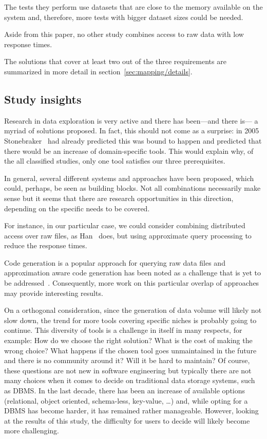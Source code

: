 The tests they perform use datasets that are close
to the memory available on the system and, therefore, more tests with bigger dataset sizes
could be needed.

Aside from this paper, no other study combines access to raw data with low
response times.

The solutions that cover at least two out of the three requirements are 
summarized in more detail in section~\ref{sec:mapping/details}.

\subsection{Study insights}
\label{sec:mapping/insights}
Research in data exploration is very active and there has been---and there is---
a myriad of solutions proposed. In fact, this should not come as a surprise:
in 2005 Stonebraker~\cite{Stonebraker2005} had already predicted this was bound to
happen and predicted that there would be an increase of domain-specific tools.
This would explain why, of the all classified studies, only one tool satisfies our
three prerequisites.

In general, several different systems and approaches have been proposed, which could,
perhaps, be seen as building blocks. Not all combinations necessarily make sense
but it seems that there are research opportunities in this direction, depending
on the specific needs to be covered.

For instance, in our particular case, we could consider combining distributed
access over raw files, as Han~\cite{Han2017} does, but using approximate query
processing to reduce the response times.

Code generation is a popular approach for querying raw data files
and approximation aware code generation has been noted as a challenge
that is yet to be addressed~\cite{Mozafari2017AQP}. Consequently, more work on this
particular overlap of approaches may provide interesting results.

On a orthogonal consideration, since the generation of data volume will likely
not slow down, the trend for more tools covering specific
niches is probably going to continue. This diversity of tools is a
challenge in itself in many respects, for example: How do we choose the right solution? What is
the cost of making the wrong choice? What happens if the chosen tool goes
unmaintained in the future and there is no community around it? Will it
be hard to maintain? Of course, these questions are not new in software
engineering but typically there are not many choices when it comes to decide
on traditional data storage systems, such as DBMS.
In the last decade, there has been an increase of available options
(relational, object oriented, schema-less, key-value, \ldots) and, while opting
for a DBMS has become harder, it has remained rather manageable. However, looking at the
results of this study, the difficulty for users to decide will likely become
more challenging.

